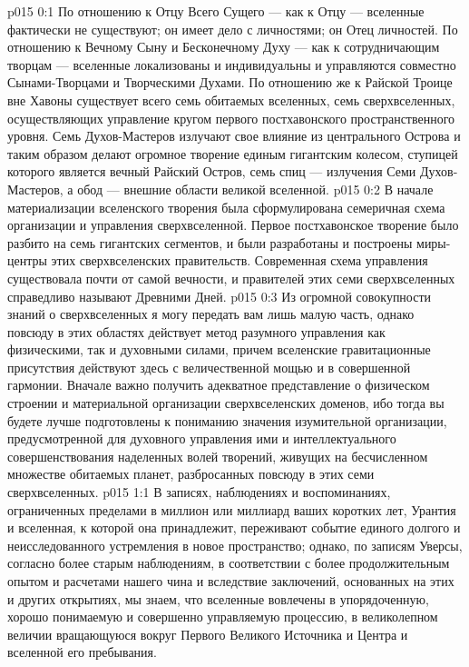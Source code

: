 \author{Вселенский Цензор}
\vs p015 0:1 По отношению к Отцу Всего Сущего --- как к Отцу --- вселенные фактически не существуют; он имеет дело с личностями; он Отец личностей. По отношению к Вечному Сыну и Бесконечному Духу --- как к сотрудничающим творцам --- вселенные локализованы и индивидуальны и управляются совместно Сынами\hyp{}Творцами и Творческими Духами. По отношению же к Райской Троице вне Хавоны существует всего семь обитаемых вселенных, семь сверхвселенных, осуществляющих управление кругом первого постхавонского пространственного уровня. Семь Духов\hyp{}Мастеров излучают свое влияние из центрального Острова и таким образом делают огромное творение единым гигантским колесом, ступицей которого является вечный Райский Остров, семь спиц --- излучения Семи Духов\hyp{}Мастеров, а обод --- внешние области великой вселенной.
\vs p015 0:2 В начале материализации вселенского творения была сформулирована семеричная схема организации и управления сверхвселенной. Первое постхавонское творение было разбито на семь гигантских сегментов, и были разработаны и построены миры\hyp{}центры этих сверхвселенских правительств. Современная схема управления существовала почти от самой вечности, и правителей этих семи сверхвселенных справедливо называют Древними Дней.
\vs p015 0:3 Из огромной совокупности знаний о сверхвселенных я могу передать вам лишь малую часть, однако повсюду в этих областях действует метод разумного управления как физическими, так и духовными силами, причем вселенские гравитационные присутствия действуют здесь с величественной мощью и в совершенной гармонии. Вначале важно получить адекватное представление о физическом строении и материальной организации сверхвселенских доменов, ибо тогда вы будете лучше подготовлены к пониманию значения изумительной организации, предусмотренной для духовного управления ими и интеллектуального совершенствования наделенных волей творений, живущих на бесчисленном множестве обитаемых планет, разбросанных повсюду в этих семи сверхвселенных.
\vs p015 1:1 В записях, наблюдениях и воспоминаниях, ограниченных пределами в миллион или миллиард ваших коротких лет, Урантия и вселенная, к которой она принадлежит, переживают событие единого долгого и неисследованного устремления в новое пространство; однако, по записям Уверсы, согласно более старым наблюдениям, в соответствии с более продолжительным опытом и расчетами нашего чина и вследствие заключений, основанных на этих и других открытиях, мы знаем, что вселенные вовлечены в упорядоченную, хорошо понимаемую и совершенно управляемую процессию, в великолепном величии вращающуюся вокруг Первого Великого Источника и Центра и вселенной его пребывания.
